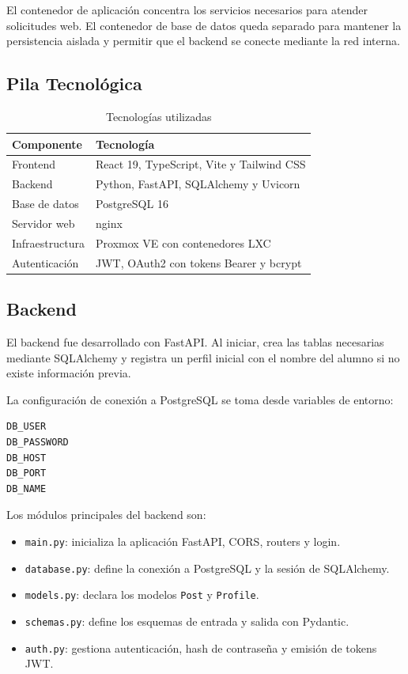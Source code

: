 \documentclass[twoside, 11pt, a4paper]{article}
\begin{document}
    El contenedor de aplicación concentra los servicios necesarios para atender solicitudes web. El contenedor de base de datos queda separado para mantener la persistencia aislada y permitir que el backend se conecte mediante la red interna.

    \subsection{Pila Tecnológica}

    \begin{table}[H]
        \centering
        \begin{tabular}{|l|l|}
            \hline
            \textbf{Componente} & \textbf{Tecnología} \\
            \hline
            Frontend & React 19, TypeScript, Vite y Tailwind CSS \\
            Backend & Python, FastAPI, SQLAlchemy y Uvicorn \\
            Base de datos & PostgreSQL 16 \\
            Servidor web & nginx \\
            Infraestructura & Proxmox VE con contenedores LXC \\
            Autenticación & JWT, OAuth2 con tokens Bearer y bcrypt \\
            \hline
        \end{tabular}
        \caption{Tecnologías utilizadas}
    \end{table}

    \subsection{Backend}

    El backend fue desarrollado con FastAPI. Al iniciar, crea las tablas necesarias mediante SQLAlchemy y registra un perfil inicial con el nombre del alumno si no existe información previa.

    La configuración de conexión a PostgreSQL se toma desde variables de entorno:

    \begin{verbatim}
DB_USER
DB_PASSWORD
DB_HOST
DB_PORT
DB_NAME
    \end{verbatim}

    Los módulos principales del backend son:

    \begin{itemize}
        \item \texttt{main.py}: inicializa la aplicación FastAPI, CORS, routers y login.
        \item \texttt{database.py}: define la conexión a PostgreSQL y la sesión de SQLAlchemy.
        \item \texttt{models.py}: declara los modelos \texttt{Post} y \texttt{Profile}.
        \item \texttt{schemas.py}: define los esquemas de entrada y salida con Pydantic.
        \item \texttt{auth.py}: gestiona autenticación, hash de contraseña y emisión de tokens JWT.
    \end{itemize}
\end{document}
